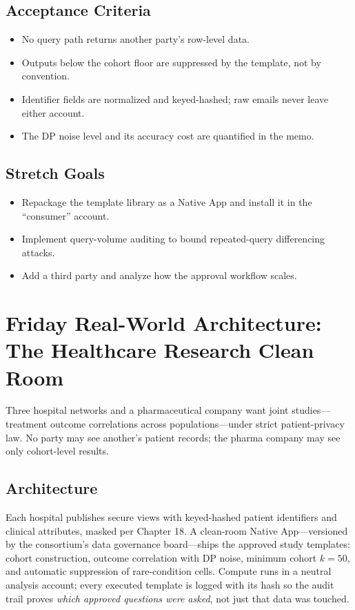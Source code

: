 \subsection*{Acceptance Criteria}
\begin{itemize}
    \item No query path returns another party's row-level data.
    \item Outputs below the cohort floor are suppressed by the template, not by convention.
    \item Identifier fields are normalized and keyed-hashed; raw emails never leave either account.
    \item The DP noise level and its accuracy cost are quantified in the memo.
\end{itemize}

\subsection*{Stretch Goals}
\begin{itemize}
    \item Repackage the template library as a Native App and install it in the ``consumer'' account.
    \item Implement query-volume auditing to bound repeated-query differencing attacks.
    \item Add a third party and analyze how the approval workflow scales.
\end{itemize}

\section{Friday Real-World Architecture: The Healthcare Research Clean Room}
Three hospital networks and a pharmaceutical company want joint studies---treatment outcome correlations across populations---under strict patient-privacy law. No party may see another's patient records; the pharma company may see only cohort-level results.

\subsection{Architecture}
Each hospital publishes secure views with keyed-hashed patient identifiers and clinical attributes, masked per Chapter 18. A clean-room Native App---versioned by the consortium's data governance board---ships the approved study templates: cohort construction, outcome correlation with DP noise, minimum cohort $k=50$, and automatic suppression of rare-condition cells. Compute runs in a neutral analysis account; every executed template is logged with its hash so the audit trail proves \emph{which approved questions were asked}, not just that data was touched.

